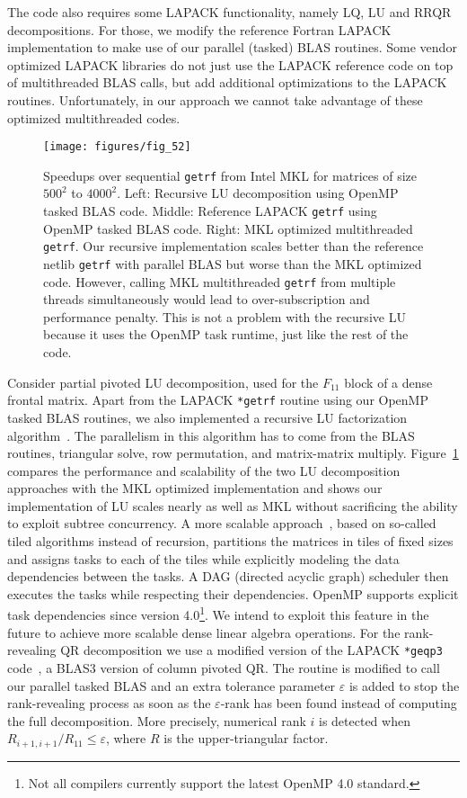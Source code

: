 \documentclass{article}
\newcommand{\tm}{\textsuperscript{\textregistered}}
\begin{document}
The code also requires some LAPACK functionality, namely LQ, LU and
RRQR decompositions. For those, we modify the reference Fortran LAPACK
implementation to make use of our parallel (tasked) BLAS
routines. Some vendor optimized LAPACK libraries do not just use the
LAPACK reference code on top of multithreaded BLAS calls, but add
additional optimizations to the LAPACK routines. Unfortunately, in our
approach we cannot take advantage of these optimized multithreaded
codes.
\begin{figure}
  \begin{center}
    \texttt{[image: figures/fig\_52]}
  \end{center}
  \caption{\footnotesize Speedups over sequential \texttt{getrf} from
    Intel\tm{} MKL for matrices of size $500^2$ to $4000^2$. Left:
    Recursive LU decomposition using OpenMP tasked BLAS code. Middle:
    Reference LAPACK \texttt{getrf} using OpenMP tasked BLAS
    code. Right: MKL optimized multithreaded \texttt{getrf}. Our
    recursive implementation scales better than the reference netlib
    \texttt{getrf} with parallel BLAS but worse than the MKL optimized
    code. However, calling MKL multithreaded \texttt{getrf} from
    multiple threads simultaneously would lead to over-subscription
    and performance penalty. This is not a problem with the recursive
    LU because it uses the OpenMP task runtime, just like the rest of
    the code.}
  \label{fig:scaling_LU}
\end{figure}
Consider partial pivoted LU decomposition, used for the $F_{11}$ block
of a dense frontal matrix. Apart from the LAPACK \verb+*getrf+ routine
using our OpenMP tasked BLAS routines, we also implemented a recursive
LU factorization
algorithm~\cite{recursiveTileLU}. The parallelism in this algorithm has to come from the BLAS routines,
triangular solve, row permutation, and matrix-matrix
multiply. Figure~\ref{fig:scaling_LU} compares the performance and
scalability of the two LU decomposition approaches with the MKL
optimized implementation and shows our implementation of LU scales
nearly as well as MKL without sacrificing the ability to exploit
subtree concurrency. A more scalable approach~\cite{buttari2009class},
based on so-called tiled algorithms instead of recursion, partitions
the matrices in tiles of fixed sizes and assigns tasks to each of the
tiles while explicitly modeling the data dependencies between the
tasks. A DAG (directed acyclic graph) scheduler then executes the
tasks while respecting their dependencies. OpenMP supports explicit
task dependencies since version 4.0\footnote{Not all compilers
  currently support the latest OpenMP 4.0 standard.}. We intend to
exploit this feature in the future to achieve more scalable dense
linear algebra operations.
For the rank-revealing QR decomposition we use a modified version of
the LAPACK \verb+*geqp3+ code~\cite{quintana1998blas}, a BLAS3 version
of column pivoted QR. The routine is modified to call our parallel
tasked BLAS and an extra tolerance parameter $\varepsilon$ is added to
stop the rank-revealing process as soon as the $\varepsilon$-rank has
been found instead of computing the full decomposition. More
precisely, numerical rank $i$ is detected when $R_{i+1,i+1} / R_{11}
\leq \varepsilon$, where $R$ is the upper-triangular factor.
\end{document}
